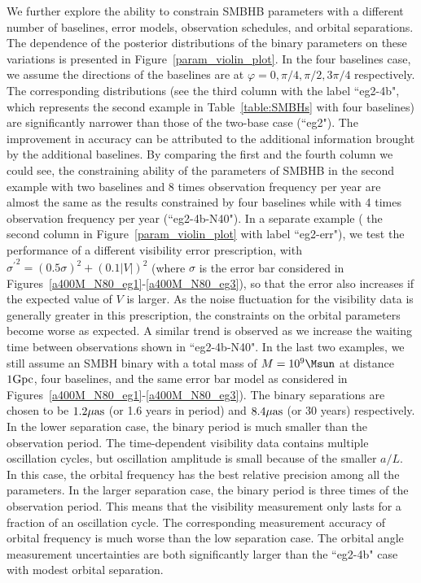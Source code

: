\documentclass[twocolumn]{aastex62}
\begin{document}
We further explore the ability to constrain SMBHB parameters with a different number of baselines,  error models, observation schedules,  and orbital separations. The dependence of the posterior distributions of the binary parameters on these variations is presented in Figure~\ref{param_violin_plot}.  In the four baselines case, we assume the directions of the baselines are at $\varphi=0, \pi/4, \pi/2, 3\pi/4$ respectively.  The corresponding distributions (see the third column with the label ``eg2-4b", which represents the second example in Table~\ref{table:SMBHs} with four baselines) are significantly narrower than those of the two-base case (``eg2"). 
The improvement in accuracy can be attributed to the additional information brought by  the additional baselines. 
By comparing the first and the fourth column we could see, the constraining ability of the parameters of SMBHB in the second example with two baselines and 8 times observation frequency per year are almost the same as the results constrained by four baselines while with 4 times observation frequency per year (``eg2-4b-N40"). 
In a separate example ( the second column in Figure~\ref{param_violin_plot} with label ``eg2-err"),  we test the performance of a different visibility error prescription, with ${{\sigma}^{\prime}}^2=(0.5 \sigma)^2+ (0.1 |V|)^2$ (where $\sigma$ is the error bar considered in Figures~\ref{a400M_N80_eg1}-\ref{a400M_N80_eg3}), so that the error also increases if the expected value of $V$ is larger. As the noise fluctuation for the visibility data is generally greater in this prescription, the constraints on the orbital parameters become worse as expected. 
A similar trend is observed as we increase the waiting time between observations shown in ``eg2-4b-N40". 
In the last two examples, we still assume an SMBH binary  with a total mass of $M=10^9\Msun$ at distance $1{\rm Gpc}$, four baselines, and the same  error bar model as considered in Figures~\ref{a400M_N80_eg1}-\ref{a400M_N80_eg3}). The binary separations are chosen to be  $1.2 \mu{\rm  as}$ (or 1.6 years in period) and $8.4 \mu{\rm as}$ (or 30 years) respectively.  In the lower separation case, the binary period is much smaller than the observation period. The time-dependent visibility data contains multiple oscillation cycles, but oscillation amplitude is small because of the smaller $a/L$. In this case, the orbital frequency  has the best relative precision among all the parameters.
In the larger separation case, the binary period is three times of the observation period. This means that the visibility measurement only lasts for a fraction of an oscillation cycle. The corresponding measurement accuracy of orbital frequency is much worse than the low separation case.  The orbital angle measurement uncertainties are both significantly larger than the ``eg2-4b" case with modest orbital separation.
\end{document}
